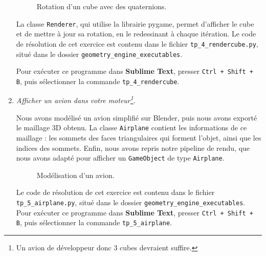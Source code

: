 \documentclass[a4paper,12pt]{article}
\begin{document}
\begin{enumerate}
    \begin{figure}[h]
    \centering
    \caption{Rotation d'un cube avec des quaternions.}
    \label{fig:cube}
    \end{figure}

    La classe \texttt{Renderer}, qui utilise la librairie pygame, permet d'afficher le cube et de mettre à jour sa rotation, en le redessinant à chaque itération.
    Le code de résolution de cet exercice est contenu dans le fichier \texttt{tp\_4\_rendercube.py}, situé dans le dossier \texttt{geometry\_engine\_executables}.
    
    Pour exécuter ce programme dans \textbf{Sublime Text}, presser \texttt{Ctrl + Shift + B}, puis sélectionner la commande \texttt{tp\_4\_rendercube}.

    \item \emph{Afficher un avion dans votre moteur\footnote{Un avion de développeur donc 3 cubes devraient suffire.}.}

    Nous avons modélisé un avion simplifié sur Blender, puis nous avons exporté le maillage 3D obtenu. La classe \texttt{Airplane} contient les informations de ce maillage : les sommets des faces triangulaires qui forment l'objet, ainsi que les indices des sommets.
    Enfin, nous avons repris notre pipeline de rendu, que nous avons adapté pour afficher un \texttt{GameObject} de type \texttt{Airplane}.

    \begin{figure}[h]
    \centering
    \caption{Modélisation d'un avion.}
    \label{fig:avion}
    \end{figure}

    Le code de résolution de cet exercice est contenu dans le fichier \texttt{tp\_5\_airplane.py}, situé dans le dossier \texttt{geometry\_engine\_executables}. Pour exécuter ce programme dans \textbf{Sublime Text}, presser \texttt{Ctrl + Shift + B}, puis sélectionner la commande \texttt{tp\_5\_airplane}.
\end{enumerate}
\end{document}
